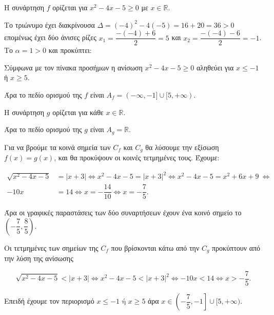 
\begin{alist}
\item Η συνάρτηση $f$ ορίζεται για $x^2 - 4x - 5 \ge 0$ με $x \in \mathbb{R}$.

Το τριώνυμο έχει διακρίνουσα $\Delta = (-4)^2 - 4(-5) = 16 + 20 = 36 > 0$ επομένως έχει δύο
άνισες ρίζες $x_1 = \dfrac{-(-4)+6}{2} = 5$ και $x_2 = \dfrac{-(-4)-6}{2} = -1$. Το $\alpha=1>0$ και προκύπτει:
\begin{center}
\end{center}
Σύμφωνα με τον πίνακα προσήμων η ανίσωση $x^2 - 4x - 5 \ge 0$ αληθεύει
για $x \le -1$ ή $x \ge 5$.

Άρα το πεδίο ορισμού της $f$ είναι $A_f = (-\infty, -1] \cup [5, +\infty)$.

Η συνάρτηση $g$ ορίζεται για κάθε $x \in \mathbb{R}$.

Άρα το πεδίο ορισμού της $g$ είναι $A_g = \mathbb{R}$.

\item Για να βρούμε τα κοινά σημεία των $C_f$ και $C_g$ θα λύσουμε την εξίσωση
$f(x) = g(x)$, και θα προκύψουν οι κοινές τετμημένες τους. Έχουμε:

\begin{align*}
\sqrt{x^2 - 4x - 5} &= |x + 3| \Leftrightarrow x^2 - 4x - 5 = |x + 3|^2 \Leftrightarrow x^2 - 4x - 5 = x^2 + 6x + 9 \ \Leftrightarrow \\
-10x &= 14 \Leftrightarrow x = -\dfrac{14}{10} \Leftrightarrow x = -\dfrac{7}{5}.
\end{align*}

Άρα οι γραφικές παραστάσεις των δύο συναρτήσεων έχουν ένα κοινό σημείο το $\left(-\dfrac{7}{5}, \dfrac{8}{5}\right)$.

\item Οι τετμημένες των σημείων της $C_f$ που βρίσκονται κάτω από την $C_g$
προκύπτουν από την λύση της ανίσωσης

\[\sqrt{x^2 - 4x - 5} < |x + 3| \Leftrightarrow x^2 - 4x - 5 < |x + 3|^2 \Leftrightarrow -10x < 14 \Leftrightarrow x > -\dfrac{7}{5}.\]

Επειδή έχουμε τον περιορισμό $x \le -1 \text{ ή } x \ge 5$ άρα $x \in \left(-\dfrac{7}{5}, -1\right] \cup [5, +\infty)$.
\end{alist}

